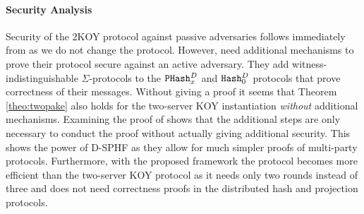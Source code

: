 %
%
%

\paragraph{Security Analysis}
Security of the 2KOY protocol against passive adversaries follows immediately from \cite[Theorem 1]{Katz2012a} as we do not change the protocol.
However, \citet{Katz2012a} need additional mechanisms to prove their protocol secure against an active adversary.
They add witness-indistinguishable $\Sigma$-protocols to the $\mathtt{PHash}_x^{D}$ and $\mathtt{Hash}_0^{D}$ protocols that prove correctness of their messages.
Without giving a proof it seems that Theorem \ref{theo:twopake} also holds for the two-server KOY instantiation \emph{without} additional mechanisms.
Examining the proof of \cite[Theorem 2]{Katz2012a} shows that the additional steps are only necessary to conduct the proof without actually giving additional security.
This shows the power of \ac{D-SPHF} as they allow for much simpler proofs of multi-party protocols.
Furthermore, with the proposed framework the protocol becomes more efficient than the two-server KOY protocol as it needs only two rounds instead of three and does not need correctness proofs in the distributed hash and projection protocols.
